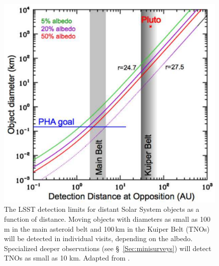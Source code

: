 \begin{figure}
\includegraphics[width=1.0\hsize,clip]{Af9}
\caption{The LSST detection limits for distant Solar System objects as
  a function of distance.
Moving objects with diameters as small as 100\,m in the main asteroid belt and
100\,km in the Kuiper Belt (TNOs) will be detected in individual visits,
depending on the albedo. Specialized deeper observations
(see \S~\ref{Sec:minisurveys}) will detect TNOs as small as 10 km. Adapted from
\citet{2007AAS...21113714J}.}
\label{Fig:Af9}
\end{figure}



